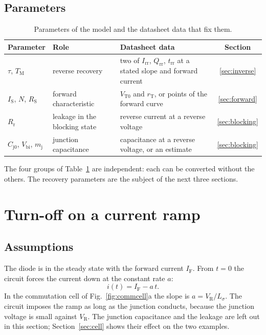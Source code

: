 \documentclass[10pt,a4paper]{scrartcl}
\newcommand{\IF}{I_\mathrm{F}}
\newcommand{\VR}{V_\mathrm{R}}
\newcommand{\Irr}{I_\mathrm{rr}}
\newcommand{\Qrr}{Q_\mathrm{rr}}
\newcommand{\trr}{t_\mathrm{rr}}
\newcommand{\TM}{T_\mathrm{M}}
\newcommand{\IS}{I_\mathrm{S}}
\newcommand{\RS}{R_\mathrm{S}}
\newcommand{\Rr}{R_\mathrm{r}}
\newcommand{\VTo}{V_\mathrm{T0}}
\newcommand{\rT}{r_\mathrm{T}}
\newcommand{\Cjo}{C_\mathrm{j0}}
\newcommand{\Nem}{N}                          %
\newcommand{\Ls}{L_\sigma}                    %
\newcommand{\Vbi}{V_\mathrm{bi}}
\begin{document}
\subsection{Parameters}
\begin{table}[htb]
\centering\small
\caption{Parameters of the model and the datasheet data that fix them.}
\label{tab:params}
\begin{tabular}{@{}ll>{\raggedright\arraybackslash}p{6.4cm}c@{}}
\toprule
Parameter & Role & Datasheet data & Section \\
\midrule
$\tau$, $\TM$ & reverse recovery & two of $\Irr$, $\Qrr$, $\trr$ at a stated slope and forward current & \ref{sec:inverse} \\
$\IS$, $\Nem$, $\RS$ & forward characteristic & $\VTo$ and $\rT$, or points of the forward curve & \ref{sec:forward} \\
$\Rr$ & leakage in the blocking state & reverse current at a reverse voltage & \ref{sec:blocking} \\
$\Cjo$, $\Vbi$, $m_\mathrm{j}$ & junction capacitance & capacitance at a reverse voltage, or an estimate & \ref{sec:blocking} \\
\bottomrule
\end{tabular}
\end{table}
The four groups of Table~\ref{tab:params} are independent: each can be converted without the others. The recovery parameters are the subject of the next three sections.

\section{Turn-off on a current ramp}
\label{sec:ramp}
\subsection{Assumptions}
The diode is in the steady state with the forward current $\IF$. From $t = 0$ the circuit forces the current down at the constant rate $a$:
\begin{equation}
i(t) = \IF - a\,t .
\label{eq:ramp}
\end{equation}
In the commutation cell of Fig.~\ref{fig:commcell}a the slope is $a = \VR/\Ls$. The circuit imposes the ramp as long as the junction conducts, because the junction voltage is small against $\VR$. The junction capacitance and the leakage are left out in this section; Section~\ref{sec:cell} shows their effect on the two examples.
\end{document}
